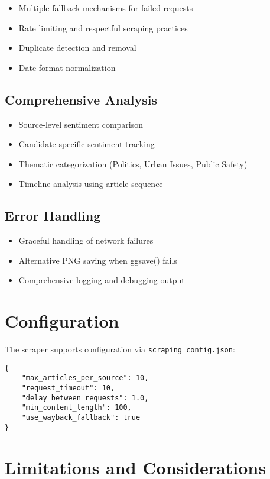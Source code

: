 \documentclass[11pt]{article}
\begin{document}
\begin{itemize}
    \item Multiple fallback mechanisms for failed requests
    \item Rate limiting and respectful scraping practices
    \item Duplicate detection and removal
    \item Date format normalization
\end{itemize}

\subsection{Comprehensive Analysis}

\begin{itemize}
    \item Source-level sentiment comparison
    \item Candidate-specific sentiment tracking
    \item Thematic categorization (Politics, Urban Issues, Public Safety)
    \item Timeline analysis using article sequence
\end{itemize}

\subsection{Error Handling}

\begin{itemize}
    \item Graceful handling of network failures
    \item Alternative PNG saving when ggsave() fails
    \item Comprehensive logging and debugging output
\end{itemize}

\section{Configuration}

The scraper supports configuration via \texttt{scraping\_config.json}:

\begin{verbatim}
{
    "max_articles_per_source": 10,
    "request_timeout": 10,
    "delay_between_requests": 1.0,
    "min_content_length": 100,
    "use_wayback_fallback": true
}
\end{verbatim}

\section{Limitations and Considerations}
\end{document}
